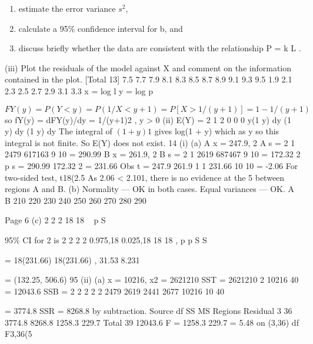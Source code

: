 \documentclass[a4paper,12pt]{article}
\begin{document}
\begin{enumerate}
\begin{enumerate}
\item estimate the error variance $s^2$,
\item calculate a 95\% confidence interval for b, and
\item discuss briefly whether the data are consistent with the
relationship P = k L . 
\end{enumerate}

(iii) Plot the residuals of the model against X and comment on the
information contained in the plot. 
[Total 13]
7.5
7.7
7.9
8.1
8.3
8.5
8.7
8.9
9.1
9.3
9.5
1.9 2.1 2.3 2.5 2.7 2.9 3.1 3.3
x = log l
y = log p


\end{enumerate}
\newpage

\item 
\[FY(y) = P(Y < y) = P(1/X < y + 1) = P[X > 1/(y + 1)] = 1 - 1/(y + 1)\]
so fY(y) = dFY(y)/dy = 1/(y+1)2 , y > 0
(ii) E(Y) = 2 1 2
0 0 0
y(1 y) dy (1 y) dy (1 y) dy
The integral of $(1 + y) 1$ gives log(1 + y) which 
as y 
 so this
integral is not finite. So E(Y) does not exist.
14 (i) (a) A
x = 247.9, 2
A
s =
2 1 2479
617163
9 10
= 290.99
B
x = 261.9, 2
B
s =
2 1 2619
687467
9 10
= 172.32
2
p
s =
290.99 172.32
2
= 231.66
Obs t =
247.9 261.9
1 1
231.66
10 10
= -2.06
For two-sided test, t18(2.5%
As 2.06 < 2.101, there is no evidence at the 5%
between regions A and B.
(b)
Normality — OK in both cases.
Equal variances — OK.
A
B
210 220 230 240 250 260 270 280 290

Page 6
(c)
2
2
2 18
18
~ p
S


 95\% CI for 2 is
2 2
2 2
0.975,18 0.025,18
18 18
, p p
 S S 
 
=
18(231.66) 18(231.66)
,
31.53 8.231


= (132.25, 506.6)
 95%
(ii) (a) x = 10216, x2 = 2621210
SST = 2621210 
2 10216
40
= 12043.6
SSB =
2 2 2 2 2 2479 2619 2441 2677 10216
10 40
  
 = 3774.8
 SSR = 8268.8 by subtraction.
Source df SS MS
Regions
Residual
3
36
3774.8
8268.8
1258.3
229.7
Total 39 12043.6
F =
1258.3
229.7
= 5.48 on (3,36) df
F3,36(5%
\end{document}
